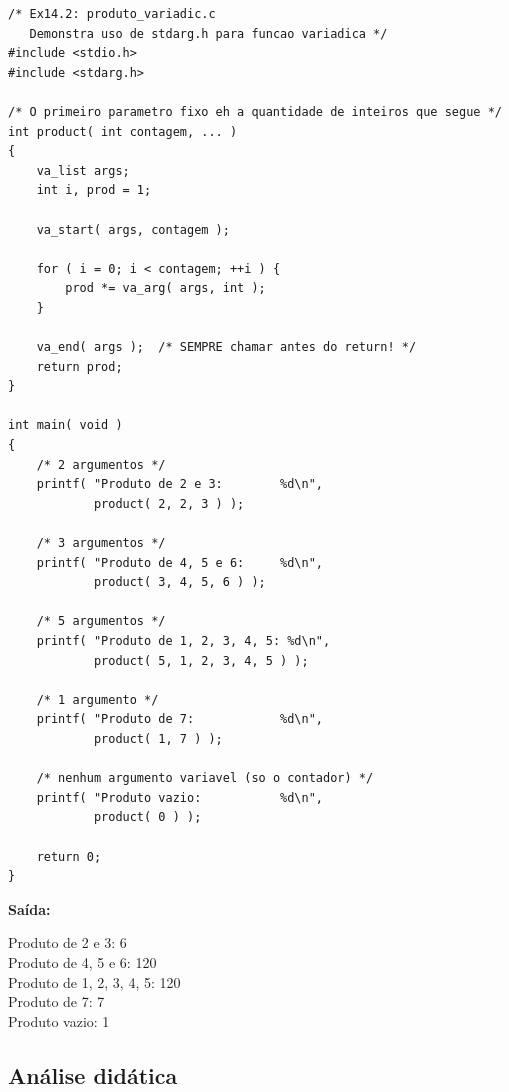 \documentclass[12pt,a4paper]{article}
\begin{document}
\begin{respostabox}
\begin{lstlisting}
/* Ex14.2: produto_variadic.c
   Demonstra uso de stdarg.h para funcao variadica */
#include <stdio.h>
#include <stdarg.h>

/* O primeiro parametro fixo eh a quantidade de inteiros que segue */
int product( int contagem, ... )
{
    va_list args;
    int i, prod = 1;

    va_start( args, contagem );

    for ( i = 0; i < contagem; ++i ) {
        prod *= va_arg( args, int );
    }

    va_end( args );  /* SEMPRE chamar antes do return! */
    return prod;
}

int main( void )
{
    /* 2 argumentos */
    printf( "Produto de 2 e 3:        %d\n",
            product( 2, 2, 3 ) );

    /* 3 argumentos */
    printf( "Produto de 4, 5 e 6:     %d\n",
            product( 3, 4, 5, 6 ) );

    /* 5 argumentos */
    printf( "Produto de 1, 2, 3, 4, 5: %d\n",
            product( 5, 1, 2, 3, 4, 5 ) );

    /* 1 argumento */
    printf( "Produto de 7:            %d\n",
            product( 1, 7 ) );

    /* nenhum argumento variavel (so o contador) */
    printf( "Produto vazio:           %d\n",
            product( 0 ) );

    return 0;
}
\end{lstlisting}

\textbf{Saída:}
\begin{saida}
Produto de 2 e 3:        6\\
Produto de 4, 5 e 6:     120\\
Produto de 1, 2, 3, 4, 5: 120\\
Produto de 7:            7\\
Produto vazio:           1
\end{saida}
\end{respostabox}

\subsection*{Análise didática}
\end{document}
